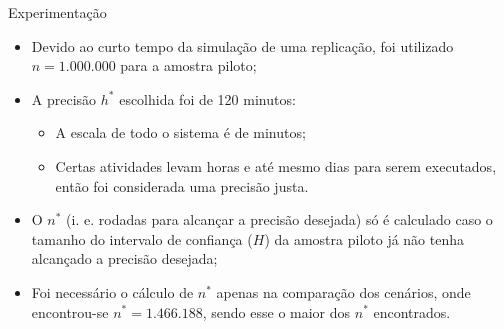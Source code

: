 \documentclass[xcolor=dvipsnames]{beamer}
\let\olditem=\item%
\renewcommand{\item}{\olditem \justifying}%
\begin{document}
\begin{frame}{Experimentação}
	\begin{itemize}
		\item Devido ao curto tempo da simulação de uma replicação, foi utilizado $n=1.000.000$ para a amostra piloto;
		      			
		      \bigskip
		      			
		\item A precisão $h^*$ escolhida foi de 120 minutos:
        \medskip
		      \begin{itemize}
		      	\item A escala de todo o sistema é de minutos;
		      	      \bigskip
		      	\item Certas atividades levam horas e até mesmo dias para serem executados, então foi considerada uma precisão justa.
		      \end{itemize}
		      			
		      \bigskip
		      			
		\item O $n^*$ (i. e. rodadas para alcançar a precisão desejada) só é calculado caso o tamanho do intervalo de confiança ($H$) da amostra piloto já não tenha alcançado a precisão desejada;
		      			
		      \bigskip
		      			
		\item Foi necessário o cálculo de $n^*$ apenas na comparação dos cenários, onde encontrou-se $n^*=1.466.188$, sendo esse o maior dos $n^*$ encontrados. 
	\end{itemize}
			
\end{frame}
	
\end{document}
